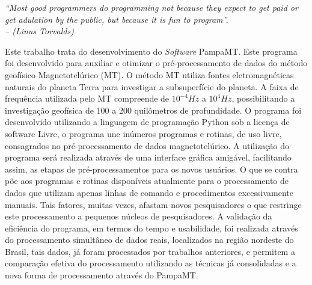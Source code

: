 \documentclass[12pt,twoside,oneright,a4paper,chapter=TITLE,english,brazil]{unipampa}
\newcommand{\en}[1]{\textit{#1}}
\newcommand{\Software}{\en{Software}}
\begin{document}
\begin{epigrafe}
    \textit{``Most good programmers do programming not because they expect to get paid or get adulation by the public, but because it is fun to program''.
    \DoubleSpacing \\
    -- (Linus Torvalds)}
\end{epigrafe}


\begin{resumo}
 Este trabalho trata do desenvolvimento do \Software{} PampaMT. Este programa foi desenvolvido para auxiliar e otimizar o pré-processamento de dados do método geofísico Magnetotelúrico (MT). O método MT utiliza fontes eletromagnéticas naturais do planeta Terra para investigar a subsuperfície do planeta. A faixa de frequência utilizada pelo MT compreende de $10^{-4} Hz$ a $10^{4} Hz$, possibilitando a investigação geofísica de 100 a 200 quilômetros de profundidade. O programa foi desenvolvido utilizando a linguagem de programação Python sob a licença de software Livre, o programa une inúmeros programas e rotinas, de uso livre, consagrados no pré-processamento de dados magnetotelúrico. A utilização do programa será realizada através de uma interface gráfica amigável, facilitando assim, as etapas de pré-processamentos para os novos usuários. O que se contra põe aos programas e rotinas disponíveis atualmente para o processamento de dados que utilizam apenas linhas de comando e procedimentos excessivamente manuais. Tais fatores, muitas vezes, afastam novos pesquisadores o que restringe este processamento a pequenos núcleos de pesquisadores. A validação da eficiência do programa, em termos do tempo e usabilidade, foi realizada através do processamento simultâneo de dados reais, localizados na região nordeste do Brasil, tais dados, já foram processados por trabalhos anteriores, e permitem a comparação efetiva do processamento utilizando as técnicas já consolidadas e a nova forma de processamento através do PampaMT.  

\end{resumo}
\end{document}
